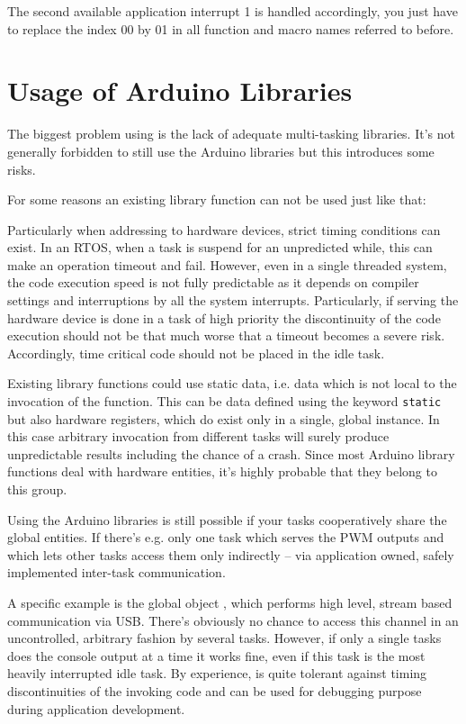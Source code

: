The second available application interrupt 1 is handled accordingly, you
just have to replace the index 00 by 01 in all function and macro names
referred to before.


\section{Usage of Arduino Libraries}

The biggest problem using \rtos{} is the lack of adequate multi-tasking
libraries. It's not generally forbidden to still use the Arduino libraries
but this introduces some risks. 

For some reasons an existing library function can not be used just like
that:

Particularly when addressing to hardware devices, strict timing conditions
can exist. In an RTOS, when a task is suspend for an unpredicted while,
this can make an operation timeout and fail. However, even in a single
threaded system, the code execution speed is not fully predictable as it
depends on compiler settings and interruptions by all the system
interrupts. Particularly, if serving the hardware device is done in a task
of high priority the discontinuity of the code execution should not be
that much worse that a timeout becomes a severe risk. Accordingly, time
critical code should not be placed in the idle task.

Existing library functions could use static data, i.e. data which is not
local to the invocation of the function. This can be data defined using
the keyword \verb+static+ but also hardware registers, which do exist only
in a single, global instance. In this case arbitrary invocation from
different tasks will surely produce unpredictable results including the
chance of a crash. Since most Arduino library functions deal with hardware
entities, it's highly probable that they belong to this group.

Using the Arduino libraries is still possible if your tasks cooperatively
share the global entities. If there's e.g. only one task which serves the
PWM outputs and which lets other tasks access them only indirectly -- via
application owned, safely implemented inter-task communication.

A specific example is the global object , which performs
high level, stream based communication via USB. There's obviously no
chance to access this channel in an uncontrolled, arbitrary fashion by
several tasks. However, if only a single tasks does the console output at
a time it works fine, even if this task is the most heavily interrupted
idle task. By experience,  is quite tolerant against timing
discontinuities of the invoking code and can be used for debugging purpose
during application development.

